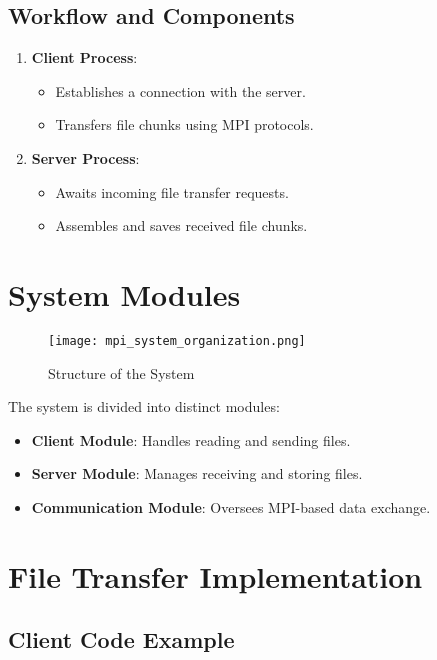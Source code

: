 \documentclass{article}
\begin{document}
\subsection{Workflow and Components}

\begin{enumerate}
    \item \textbf{Client Process}:
    \begin{itemize}
        \item Establishes a connection with the server.
        \item Transfers file chunks using MPI protocols.
    \end{itemize}
    \item \textbf{Server Process}:
    \begin{itemize}
        \item Awaits incoming file transfer requests.
        \item Assembles and saves received file chunks.
    \end{itemize}
\end{enumerate}

\section{System Modules}

\begin{figure}[h!]
    \centering
    \texttt{[image: mpi\_system\_organization.png]}
    \caption{Structure of the System}
    \label{fig:system_organization}
\end{figure}

The system is divided into distinct modules:

\begin{itemize}
    \item \textbf{Client Module}: Handles reading and sending files.
    \item \textbf{Server Module}: Manages receiving and storing files.
    \item \textbf{Communication Module}: Oversees MPI-based data exchange.
\end{itemize}

\section{File Transfer Implementation}

\subsection{Client Code Example}
\end{document}
